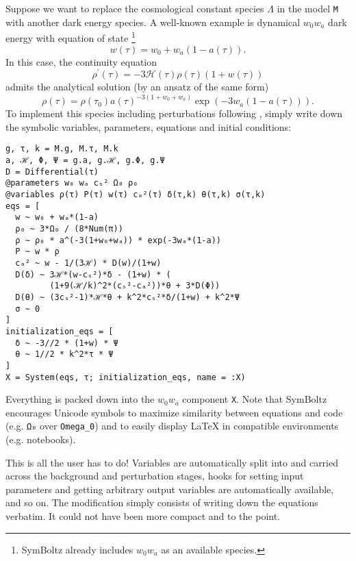 \documentclass{aa}
\newcommand\scrH{\mathscr{H}}
\begin{document}
Suppose we want to replace the cosmological constant species $\Lambda$ in the model \texttt{M} with another dark energy species.
A well-known example is dynamical $w_0 w_a$ dark energy \citep{chevallierAcceleratingUniversesScaling2001,linderExploringExpansionHistory2003} with equation of state%
\footnote{SymBoltz already includes $w_0 w_a$ as an available species.}
\begin{equation}
    w(\tau) = w_0 + w_a (1-a(\tau)).
\end{equation}
In this case, the continuity equation
\begin{equation}
    \rho^\prime(\tau) = -3\scrH(\tau)\rho(\tau)(1+w(\tau))
\end{equation}
admits the analytical solution
(by an ansatz of the same form)
\begin{equation}
    \rho(\tau)=\rho(\tau_0)a(\tau)^{-3(1+w_0+w_a)}\exp(-3w_a(1-a(\tau))).
\end{equation}
To implement this species including perturbations following \cite{putterMeasuringSpeedDark2010}, simply write down the symbolic variables, parameters, equations and initial conditions:
\begin{codebox}
\begin{Verbatim}
g, τ, k = M.g, M.τ, M.k
a, ℋ, Φ, Ψ = g.a, g.ℋ, g.Φ, g.Ψ
D = Differential(τ)
@parameters w₀ wₐ cₛ² Ω₀ ρ₀
@variables ρ(τ) P(τ) w(τ) cₐ²(τ) δ(τ,k) θ(τ,k) σ(τ,k)
eqs = [
  w ~ w₀ + wₐ*(1-a)
  ρ₀ ~ 3*Ω₀ / (8*Num(π))
  ρ ~ ρ₀ * a^(-3(1+w₀+wₐ)) * exp(-3wₐ*(1-a))
  P ~ w * ρ
  cₐ² ~ w - 1/(3ℋ) * D(w)/(1+w)
  D(δ) ~ 3ℋ*(w-cₛ²)*δ - (1+w) * (
         (1+9(ℋ/k)^2*(cₛ²-cₐ²))*θ + 3*D(Φ))
  D(θ) ~ (3cₛ²-1)*ℋ*θ + k^2*cₛ²*δ/(1+w) + k^2*Ψ
  σ ~ 0
]
initialization_eqs = [
  δ ~ -3//2 * (1+w) * Ψ
  θ ~ 1//2 * k^2*τ * Ψ
]
X = System(eqs, τ; initialization_eqs, name = :X)
\end{Verbatim}
\end{codebox}
Everything is packed down into the $w_0 w_a$ component \texttt{X}.
Note that SymBoltz encourages Unicode symbols to maximize similarity between equations and code (e.g. \texttt{Ω₀} over \texttt{Omega\_0}) and to easily display \LaTeX{} in compatible environments (e.g. notebooks).

This is all the user has to do!
Variables are automatically split into and carried across the background and perturbation stages, hooks for setting input parameters and getting arbitrary output variables are automatically available, and so on.
The modification simply consists of writing down the equations verbatim.
It could not have been more compact and to the point.
\end{document}
